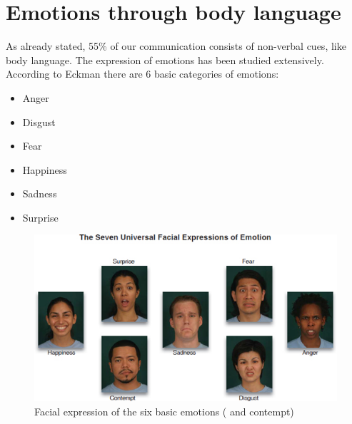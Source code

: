 \documentclass[conference]{IEEEtran}
\begin{document}
\section{Emotions through body language}
\label{sec:emotions}
As already stated, 55\% of our communication consists of non-verbal cues, like body language. The expression of emotions has been studied extensively\cite{tomkins1962,ekmann1973universal,ekman1993facial,frijda1986emotions}. According to Eckman\cite{eckman2003emotions} there are 6 basic categories of emotions:
\begin{itemize}
\item{Anger}
\item{Disgust}
\item{Fear}
\item{Happiness}
\item{Sadness}
\item{Surprise}
\end{itemize}

\begin{figure}
\centering
   \includegraphics[width=\linewidth]{basicEmotions.jpg}
   \caption{Facial expression of the six basic emotions ( and contempt)}
  \label{fig:basicEmotions}
\end{figure}
\end{document}
